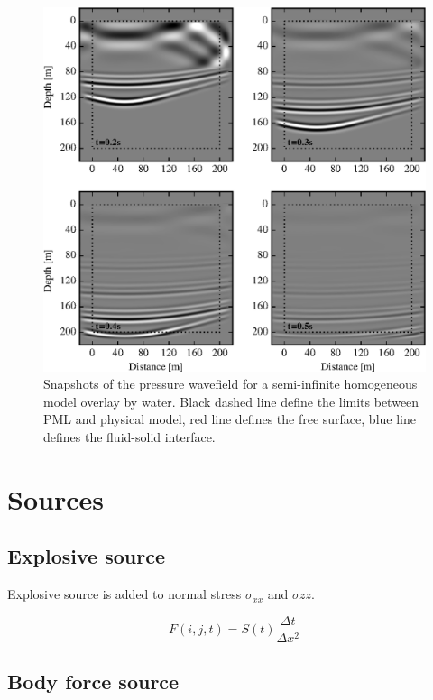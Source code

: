 \documentclass{gnulike}
\begin{document}
\begin{figure}[!ht]
  \centering
  \includegraphics[width=0.9\columnwidth]{fig/validation_snap_water.eps}
  \caption{Snapshots of the pressure wavefield for a semi-infinite homogeneous model overlay by water. Black dashed line define the limits between PML and physical model, red line defines the free surface, blue line defines the fluid-solid interface.}
\end{figure}

\section{Sources}

\subsection{Explosive source}

\noindent Explosive source is added to normal stress $\sigma_{xx}$ and $\sigma{zz}$.

\begin{equation}
  F(i,j,t) = S(t)\frac{\Delta t}{\Delta x^{2}}
\end{equation}

\subsection{Body force source}
\end{document}
